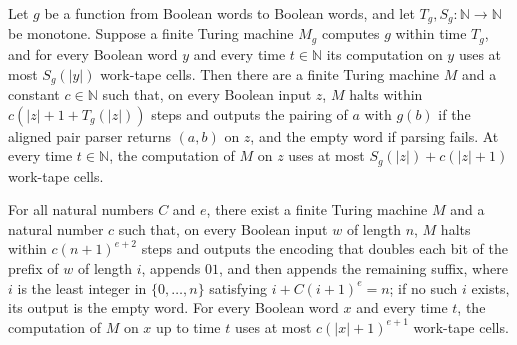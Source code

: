 \begin{theorem}
\label{Turing.FinTM.computesFunInTime_pairMapSnd_spaceUsed}
\leanok
{}
Let $g$ be a function from Boolean words to Boolean words, and let
$T_g,S_g:\mathbb{N}\to\mathbb{N}$ be monotone. Suppose a finite Turing machine $M_g$
computes $g$ within time $T_g$, and for every Boolean word $y$ and every time
$t\in\mathbb{N}$ its computation on $y$ uses at most $S_g(|y|)$ work-tape cells. Then
there are a finite Turing machine $M$ and a constant $c\in\mathbb{N}$ such that, on
every Boolean input $z$, $M$ halts within $c(|z|+1+T_g(|z|))$ steps and outputs the
pairing of $a$ with $g(b)$ if the aligned pair parser returns $(a,b)$ on $z$, and the
empty word if parsing fails. At every time $t\in\mathbb{N}$, the computation of $M$ on
$z$ uses at most $S_g(|z|)+c(|z|+1)$ work-tape cells.
\end{theorem}

\begin{theorem}
\label{Turing.FinTM.computesFunInTime_splitSolve_spaceUsed}
\leanok
{}
For all natural numbers $C$ and $e$, there exist a finite Turing machine $M$ and a
natural number $c$ such that, on every Boolean input $w$ of length $n$, $M$ halts within
$c(n+1)^{e+2}$ steps and outputs the encoding that doubles each bit of the prefix of $w$
of length $i$, appends $01$, and then appends the remaining suffix, where $i$ is the
least integer in $\{0,\ldots,n\}$ satisfying $i+C(i+1)^e=n$; if no such $i$ exists, its
output is the empty word. For every Boolean word $x$ and every time $t$, the computation
of $M$ on $x$ up to time $t$ uses at most $c(|x|+1)^{e+1}$ work-tape cells.
\end{theorem}

